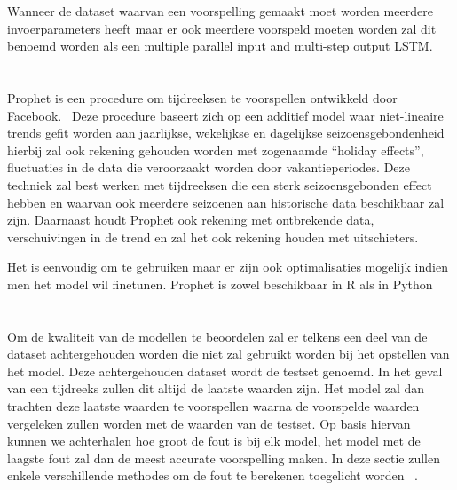 Wanneer de dataset waarvan een voorspelling gemaakt moet worden meerdere invoerparameters heeft maar er  ook meerdere voorspeld moeten worden zal dit benoemd worden als een multiple parallel input and multi-step output LSTM.

\section{}

Prophet is een procedure om tijdreeksen te voorspellen ontwikkeld door Facebook.~\autocite{Prophet2020} Deze procedure baseert zich op een additief model waar niet-lineaire trends gefit worden aan jaarlijkse, wekelijkse en dagelijkse seizoensgebondenheid hierbij zal ook rekening gehouden worden met zogenaamde ``holiday effects'', fluctuaties in de data die veroorzaakt worden door vakantieperiodes. Deze techniek zal best werken met tijdreeksen die een sterk seizoensgebonden effect hebben en waarvan ook meerdere seizoenen aan historische data beschikbaar zal zijn. Daarnaast houdt Prophet ook rekening met ontbrekende data, verschuivingen in de trend en zal het ook rekening houden met uitschieters. 

Het is eenvoudig om te gebruiken maar er zijn ook optimalisaties mogelijk indien men het model wil finetunen. Prophet is zowel beschikbaar in R als in Python



\section{}

Om de kwaliteit van de modellen te beoordelen zal er telkens een deel van de dataset achtergehouden worden die niet zal gebruikt worden bij het opstellen van het model. Deze achtergehouden dataset wordt de testset genoemd. In het geval van een tijdreeks zullen dit altijd de laatste waarden zijn. Het model zal dan trachten deze laatste waarden te voorspellen waarna de voorspelde waarden vergeleken zullen worden met de waarden van de testset. Op basis hiervan kunnen we achterhalen hoe groot de fout is bij elk model, het model met de laagste fout zal dan de meest accurate voorspelling maken. 
In deze sectie zullen enkele verschillende methodes om de fout te berekenen toegelicht worden ~\autocite{Hyndman2018}.

\subsection{}


